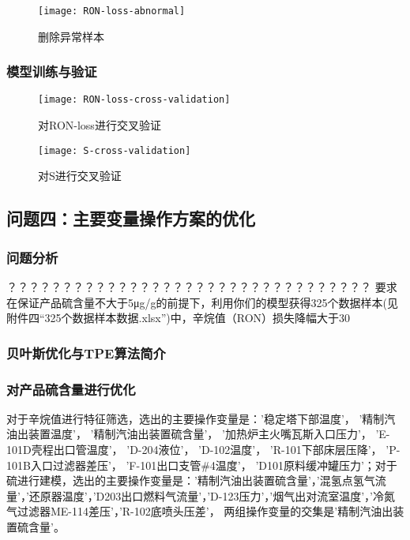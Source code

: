 \documentclass[bwprint]{gmcmthesis}
\begin{document}
\begin{figure}[htb]
	\centering
	\texttt{[image: RON-loss-abnormal]}
	\caption{删除异常样本}
\end{figure}

\FloatBarrier
\subsubsection{模型训练与验证}

\begin{figure}[htb]
	\centering
	\texttt{[image: RON-loss-cross-validation]}
	\caption{对RON-loss进行交叉验证}
\end{figure}


\begin{figure}[htb]
	\centering
	\texttt{[image: S-cross-validation]}
	\caption{对S进行交叉验证}
\end{figure}

\subsection{问题四：主要变量操作方案的优化}

\FloatBarrier
\subsubsection{问题分析}


？？？？？？？？？？？？？？？？？？？？？？？？？？？？？？？？？
要求在保证产品硫含量不大于5μg/g的前提下，利用你们的模型获得325个数据样本(见附件四“325个数据样本数据.xlsx”)中，辛烷值（RON）损失降幅大于30%

\FloatBarrier
\subsubsection{贝叶斯优化与TPE算法简介}

\FloatBarrier
\subsubsection{对产品硫含量进行优化}

对于辛烷值进行特征筛选，选出的主要操作变量是：'稳定塔下部温度'， '精制汽油出装置温度'， '精制汽油出装置硫含量'， '加热炉主火嘴瓦斯入口压力'， 'E-101D壳程出口管温度'， 'D-204液位'， 'D-102温度'， 'R-101下部床层压降'， 'P-101B入口过滤器差压'， 'F-101出口支管\#4温度'， 'D101原料缓冲罐压力'；对于硫进行建模，选出的主要操作变量是：'精制汽油出装置硫含量'，'混氢点氢气流量'，'还原器温度'，'D203出口燃料气流量'，'D-123压力'，'烟气出对流室温度'，'冷氮气过滤器ME-114差压'，'R-102底喷头压差'， 两组操作变量的交集是'精制汽油出装置硫含量'。
\end{document}
